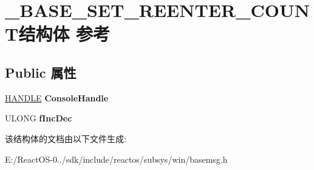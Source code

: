 \hypertarget{struct___b_a_s_e___s_e_t___r_e_e_n_t_e_r___c_o_u_n_t}{}\section{\+\_\+\+B\+A\+S\+E\+\_\+\+S\+E\+T\+\_\+\+R\+E\+E\+N\+T\+E\+R\+\_\+\+C\+O\+U\+N\+T结构体 参考}
\label{struct___b_a_s_e___s_e_t___r_e_e_n_t_e_r___c_o_u_n_t}
\subsection*{Public 属性}
\begin{DoxyCompactItemize}
\item 
\mbox{\label{struct___b_a_s_e___s_e_t___r_e_e_n_t_e_r___c_o_u_n_t_a01aabb85149f647c9bea9f81cb3bddcf}} 
\hyperlink{interfacevoid}{H\+A\+N\+D\+LE} {\bfseries Console\+Handle}
\item 
\mbox{\label{struct___b_a_s_e___s_e_t___r_e_e_n_t_e_r___c_o_u_n_t_a75fc5fdef5a498bd203961d67f403779}} 
U\+L\+O\+NG {\bfseries f\+Inc\+Dec}
\end{DoxyCompactItemize}


该结构体的文档由以下文件生成\+:\begin{DoxyCompactItemize}
\item 
E\+:/\+React\+O\+S-\/0../sdk/include/reactos/subsys/win/basemsg.\+h\end{DoxyCompactItemize}
